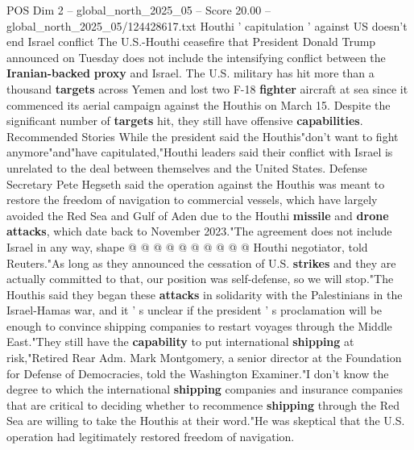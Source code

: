\begin{textsample}{POS Dim 2 – global\_north\_2025\_05 – Score 20.00 – global\_north\_2025\_05/124428617.txt}  \label{ex:f2_pos_404}
Houthi ' capitulation ' against US doesn't end Israel conflict The U.S.-Houthi ceasefire that President Donald Trump announced on Tuesday does not include the intensifying conflict between the \textbf{Iranian-backed} \textbf{proxy} and Israel.
The U.S. military has hit more than a thousand \textbf{targets} across Yemen and lost two F-18 \textbf{fighter} aircraft at sea since it commenced its aerial campaign against the Houthis on March 15.
Despite the significant number of \textbf{targets} hit, they still have offensive \textbf{capabilities}.
Recommended Stories While the president said the Houthis"don't want to fight anymore"and"have capitulated,"Houthi leaders said their conflict with Israel is unrelated to the deal between themselves and the United States.
Defense Secretary Pete Hegseth said the operation against the Houthis was meant to restore the freedom of navigation to commercial vessels, which have largely avoided the Red Sea and Gulf of Aden due to the Houthi \textbf{missile} and \textbf{drone} \textbf{attacks}, which date back to November 2023."The agreement does not include Israel in any way, shape @ @ @ @ @ @ @ @ @ @ Houthi negotiator, told Reuters."As long as they announced the cessation of U.S. \textbf{strikes} and they are actually committed to that, our position was self-defense, so we will stop."The Houthis said they began these \textbf{attacks} in solidarity with the Palestinians in the Israel-Hamas war, and it ' s unclear if the president ' s proclamation will be enough to convince shipping companies to restart voyages through the Middle East."They still have the \textbf{capability} to put international \textbf{shipping} at risk,"Retired Rear Adm.
Mark Montgomery, a senior director at the Foundation for Defense of Democracies, told the Washington Examiner."I don't know the degree to which the international \textbf{shipping} companies and insurance companies that are critical to deciding whether to recommence \textbf{shipping} through the Red Sea are willing to take the Houthis at their word."He was skeptical that the U.S. operation had legitimately restored freedom of navigation.

\end{textsample}
